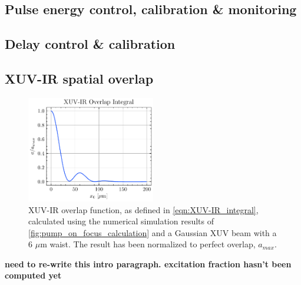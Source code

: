 \subsection{Pulse energy control, calibration \& monitoring}

\subsection{Delay control \& calibration}

\subsection{XUV-IR spatial overlap}

\begin{figure}
	\centering
	\includegraphics[width=0.5\textwidth]{figures/chap2/XUV-IR_overlap_integral.pdf}
	\caption{XUV-IR overlap function, as defined in \cref{eqn:XUV-IR_integral}, calculated using the numerical simulation results of \cref{fig:pump_on_focus_calculation} and a Gaussian XUV beam with a 6 $\mu$m waist. The result has been normalized to perfect overlap, $a_{max}$.}
	\label{fig:XUV-IR_integral}
\end{figure}

\textbf{need to re-write this intro paragraph. excitation fraction hasn't been computed yet}


